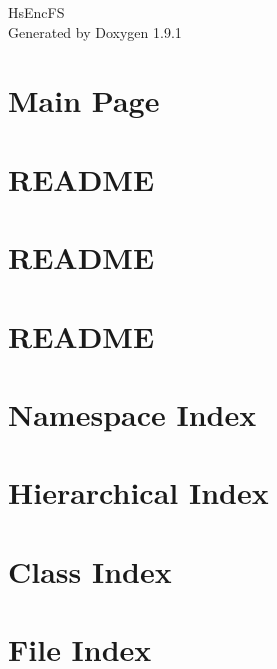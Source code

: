 \let\mypdfximage\pdfximage\def\pdfximage{\immediate\mypdfximage}\documentclass[twoside]{book}
\newcommand{\+}{\discretionary{\mbox{\scriptsize$\hookleftarrow$}}{}{}}
\newcommand{\clearemptydoublepage}{%
  \newpage{\pagestyle{empty}\cleardoublepage}%
}
\begin{document}
\raggedbottom

\hypersetup{pageanchor=false,
             bookmarksnumbered=true,
             pdfencoding=unicode
            }
\begin{titlepage}
\vspace*{7cm}
\begin{center}%
{\Large Hs\+Enc\+FS }\\
\vspace*{1cm}
{\large Generated by Doxygen 1.9.1}\\
\end{center}
\end{titlepage}
\clearemptydoublepage
{}
\tableofcontents
\clearemptydoublepage
{}
\hypersetup{pageanchor=true}

\chapter{Main Page}
\label{index}\hypertarget{index}{}
\chapter{README}
\label{md_README}

\chapter{README}
\label{md_src_test_data_README}

\chapter{README}
\label{md_src_tests_README}

\chapter{Namespace Index}

\chapter{Hierarchical Index}

\chapter{Class Index}

\chapter{File Index}

\end{document}
